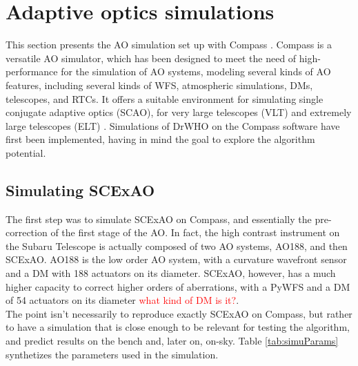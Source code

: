 \documentclass[twocolumn]{aastex62}
\begin{document}
\section{Adaptive optics simulations}

This section presents the AO simulation set up with Compass \citep{Compass}.
Compass is a versatile AO simulator, which has been designed to meet the need of high-performance for the simulation of AO systems, modeling several kinds of AO features, including several kinds of WFS, atmospheric simulations, DMs, telescopes, and RTCs. It offers a suitable environment for simulating single conjugate adaptive optics (SCAO), for very large telescopes (VLT) and extremely large telescopes (ELT) \citep{Vidal2018}.  Simulations of DrWHO on the Compass software have first been implemented, having in mind the goal to explore the algorithm potential. 


\subsection{Simulating SCExAO}

The first step was to simulate SCExAO on Compass, and essentially the pre-correction of the first stage of the AO. In fact, the high contrast instrument on the Subaru Telescope is actually composed of two AO systems, AO188, and then SCExAO. AO188 is the low order AO system, with a curvature wavefront sensor and a DM with 188 actuators on its diameter. SCExAO, however, has a much higher capacity to correct higher orders of aberrations, with a PyWFS and a DM of 54 actuators on its diameter \textcolor{red}{what kind of DM is it?}. \\

The point isn't necessarily to reproduce exactly SCExAO on Compass, but rather to have a simulation that is close enough to be relevant for testing the algorithm, and predict results on the bench and, later on, on-sky. Table \ref{tab:simuParams} synthetizes the parameters used in the simulation.\\
\end{document}
